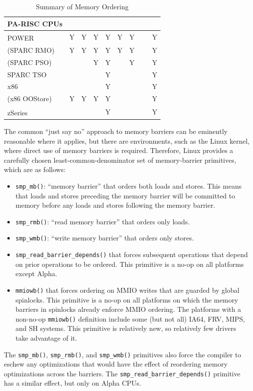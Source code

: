 \begin{table}
\begin{center}
\begin{tabular}{l|c|c|c|c|c|c|c|c}
	\hline
	PA-RISC CPUs	& ~ & ~ & ~ & ~   & ~ & ~ & ~ & ~ \\
	\hline
	POWER\textsuperscript{\texttrademark}
			& Y & Y & Y & Y   & Y & Y & ~ & Y \\
	\hline
	(SPARC RMO)	& Y & Y & Y & Y   & Y & Y & ~ & Y \\
	\hline
	(SPARC PSO)	& ~ & ~ & Y & Y   & ~ & Y & ~ & Y \\
	\hline
	SPARC TSO	& ~ & ~ & ~ & Y   & ~ & ~ & ~ & Y \\
	\hline
	x86		& ~ & ~ & ~ & Y   & ~ & ~ & ~ & Y \\
	\hline
	(x86 OOStore)	& Y & Y & Y & Y   & ~ & ~ & ~ & Y \\
	\hline
	zSeries\textsuperscript{\textregistered}
			& ~ & ~ & ~ & Y   & ~ & ~ & ~ & Y \\
\end{tabular}
\end{center}
\caption{Summary of Memory Ordering}
\label{tab:app:whymb:Summary of Memory Ordering}
\end{table}

The common ``just say no'' approach to memory barriers
can be eminently reasonable where it applies,
but there are environments, such as the Linux kernel, where direct
use of memory barriers is required.
Therefore,
Linux provides a carefully chosen least-common-denominator
set of memory-barrier primitives, which are as follows:
\begin{itemize}
\item	{\tt smp\_mb()}: ``memory barrier'' that orders both loads and
	stores.
	This means that loads and stores preceding the memory barrier
	will be committed to memory before any loads and stores
	following the memory barrier.
\item	{\tt smp\_rmb()}: ``read memory barrier'' that orders only loads.
\item	{\tt smp\_wmb()}: ``write memory barrier'' that orders only stores.
\item	{\tt smp\_read\_barrier\_depends()} that forces subsequent operations
	that depend on prior operations to be ordered.
	This primitive is a no-op on all platforms except Alpha.
\item	{\tt mmiowb()} that forces ordering on MMIO writes that are guarded
	by global spinlocks.
	This primitive is a no-op on all platforms on which the memory
	barriers in spinlocks already enforce MMIO ordering.
	The platforms with a non-no-op {\tt mmiowb()} definition include
	some (but not all) IA64, FRV, MIPS, and SH systems.
	This primitive is relatively new, so relatively few drivers take
	advantage of it.
\end{itemize}
The {\tt smp\_mb()}, {\tt smp\_rmb()}, and {\tt smp\_wmb()}
primitives also force
the compiler to eschew any optimizations that would have the effect
of reordering memory optimizations across the barriers.
The {\tt smp\_read\_barrier\_depends()} primitive has a similar effect, but
only on Alpha CPUs.

